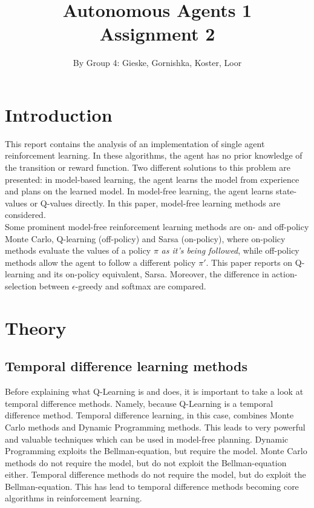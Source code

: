 \documentclass{article}
\begin{document}
\title{Autonomous Agents 1 \\ Assignment 2}

\author{By Group 4: Gieske, Gornishka, Koster, Loor}
\maketitle

\pagebreak

\section*{Introduction}
This report contains the analysis of an implementation of single agent reinforcement learning. In these algorithms, the agent has no prior knowledge of the transition or reward function. Two different solutions to this problem are presented: in model-based learning, the agent learns the model from experience and plans on the learned model. In model-free learning, the agent learns state-values or Q-values directly. In this paper, model-free learning methods are considered.\\
Some prominent model-free reinforcement learning methods are on- and off-policy Monte Carlo, Q-learning (off-policy) and Sarsa (on-policy), where on-policy methods evaluate the values of a policy $\pi$ \textit{as it's being followed}, while off-policy methods allow the agent to follow a different policy $\pi'$. This paper reports on Q-learning and its on-policy equivalent, Sarsa. Moreover, the difference in action-selection between $\epsilon$-greedy and softmax are compared. 
\pagebreak

\section*{Theory}
\subsection*{Temporal difference learning methods}
Before explaining what Q-Learning is and does, it is important to take a look at temporal difference methods. Namely, because Q-Learning is a temporal difference method. Temporal difference learning, in this case, combines Monte Carlo methods and Dynamic Programming methods. This leads to very powerful and valuable techniques which can be used in model-free planning. Dynamic Programming exploits the Bellman-equation, but require the model. Monte Carlo methods do not require the model, but do not exploit the Bellman-equation either. Temporal difference methods do not require the model, but do exploit the Bellman-equation. This has lead to temporal difference methods becoming core algorithms in reinforcement learning.
\end{document}
